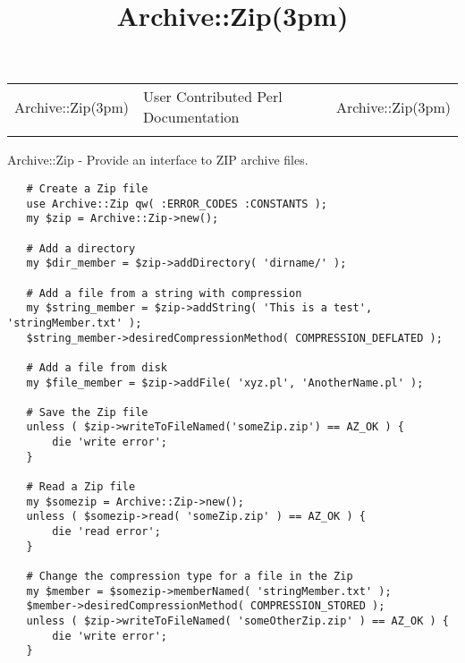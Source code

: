 \documentclass[]{article}
\title{Archive::Zip(3pm)}
\author{}
\date{}
\begin{document}
\maketitle

\begin{longtable}[c]{@{}lll@{}}
\toprule\addlinespace
Archive::Zip(3pm) & User Contributed Perl Documentation &
Archive::Zip(3pm)
\\\addlinespace
\bottomrule
\end{longtable}


Archive::Zip - Provide an interface to ZIP archive files.


\begin{verbatim}
   # Create a Zip file
   use Archive::Zip qw( :ERROR_CODES :CONSTANTS );
   my $zip = Archive::Zip->new();
   
   # Add a directory
   my $dir_member = $zip->addDirectory( 'dirname/' );
   
   # Add a file from a string with compression
   my $string_member = $zip->addString( 'This is a test', 'stringMember.txt' );
   $string_member->desiredCompressionMethod( COMPRESSION_DEFLATED );
   
   # Add a file from disk
   my $file_member = $zip->addFile( 'xyz.pl', 'AnotherName.pl' );
   
   # Save the Zip file
   unless ( $zip->writeToFileNamed('someZip.zip') == AZ_OK ) {
       die 'write error';
   }
   
   # Read a Zip file
   my $somezip = Archive::Zip->new();
   unless ( $somezip->read( 'someZip.zip' ) == AZ_OK ) {
       die 'read error';
   }
   
   # Change the compression type for a file in the Zip
   my $member = $somezip->memberNamed( 'stringMember.txt' );
   $member->desiredCompressionMethod( COMPRESSION_STORED );
   unless ( $zip->writeToFileNamed( 'someOtherZip.zip' ) == AZ_OK ) {
       die 'write error';
   }
\end{verbatim}
\end{document}
